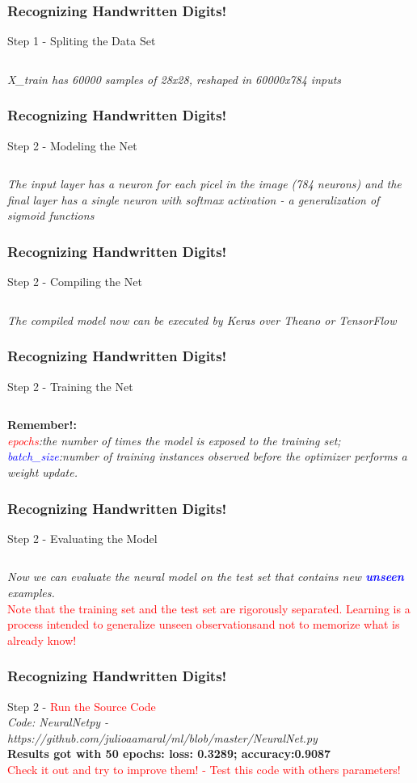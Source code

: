 \documentclass[aspectratio=169]{beamer}
\begin{document}
\begin{frame}
\frametitle{Recognizing Handwritten Digits!}
Step 1 - Spliting the Data Set
\inputminted{python}{fifteen.py}
\emph{X\_train has 60000 samples of 28x28, reshaped in 60000x784 inputs}
\end{frame}

\begin{frame}
\frametitle{Recognizing Handwritten Digits!}
Step 2 - Modeling the Net
\inputminted{python}{sixteen.py}
\emph{The input layer has a neuron for each picel in the image (784 neurons) and the final layer has a single neuron with softmax activation - a generalization of sigmoid functions}
\end{frame}

\begin{frame}
\frametitle{Recognizing Handwritten Digits!}
Step 2 - Compiling the Net
\inputminted{python}{seventeen.py}
\emph{The compiled model now can be executed by Keras over Theano or TensorFlow}
\end{frame}

\begin{frame}
\frametitle{Recognizing Handwritten Digits!}
Step 2 - Training the Net
\inputminted{python}{eighteen.py}
\textbf{Remember!:}
\\[0.5cm]
\emph{\textcolor{red}{epochs}:the number of times the model is exposed to the training set; \textcolor{blue}{batch\_size}:number of training instances observed before the optimizer performs a weight update.}
\end{frame}

\begin{frame}
\frametitle{Recognizing Handwritten Digits!}
Step 2 - Evaluating the Model 
\inputminted{python}{nineteen.py}
\emph{Now we can evaluate the neural model on the test set that contains new \textit{\textbf{\textcolor{blue}{unseen}}} examples. }
\\[0.2cm]
\textcolor{red}{Note that the training set and the test set are rigorously separated. Learning is a process intended to generalize unseen observationsand not to memorize what is already know!}
\end{frame}

\begin{frame}
\frametitle{Recognizing Handwritten Digits!}
Step 2 - \textcolor{red}{Run the Source Code}
\\[0.5cm]
\emph{Code: NeuralNetpy - https://github.com/julioaamaral/ml/blob/master/NeuralNet.py}
\\[0.3cm]
\textbf{Results got with 50 epochs: loss: 0.3289; accuracy:0.9087}
\\[0.3cm]
\textcolor{red}{Check it out and try to improve them! - Test this code with others parameters!}
\end{frame}
\end{document}
